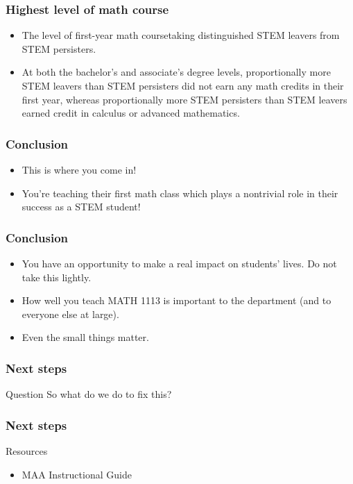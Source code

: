 \documentclass{beamer}
\begin{document}
\begin{frame}
  \frametitle{Highest level of math course}
  \begin{itemize}
    \item The level of first-year math coursetaking distinguished STEM leavers from STEM
persisters. 
\item At both the bachelor’s and associate’s degree levels, proportionally more
STEM leavers than STEM persisters did not earn any math credits in their first year,
whereas proportionally more STEM persisters than STEM leavers earned credit in
calculus or advanced mathematics.
\end{itemize}
\end{frame}

\begin{frame}
  \frametitle{Conclusion}
  \begin{itemize}
  \item This is where you come in!
  \item You're teaching their first math class which plays a nontrivial role in their success as a STEM student!
  \end{itemize}
\end{frame}

\begin{frame}
  \frametitle{Conclusion}
  \begin{itemize}
  \item You have an opportunity to make a real impact on students' lives.  Do not take this lightly.
  \item How well you teach MATH 1113 is important to the department (and to everyone else at large).
  \item Even the small things matter.  
  \end{itemize}
\end{frame}

\begin{frame}
  \frametitle{Next steps}
  \begin{block}{Question}
    So what do we do to fix this?
  \end{block}
\end{frame}

\begin{frame}
  \frametitle{Next steps}
  \begin{block}{Resources}
    \begin{itemize}
    \item MAA Instructional Guide
    \end{itemize}
  \end{block}
\end{frame}
\end{document}
